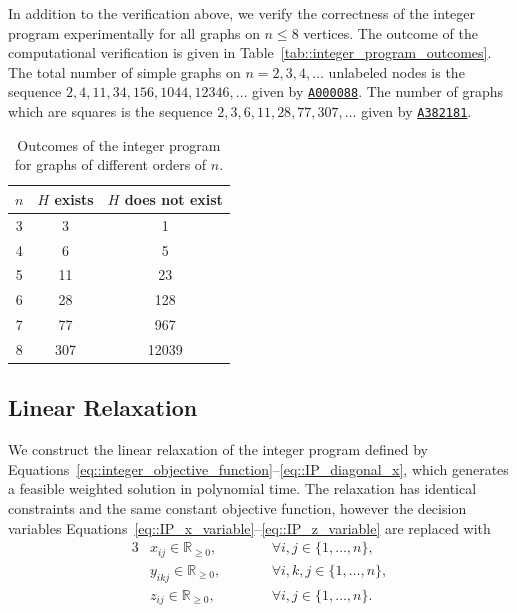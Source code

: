 \documentclass[11pt]{article}
\begin{document}
In addition to the verification above, we verify the correctness of the integer program experimentally for all graphs on $n \leq 8$ vertices. The outcome of the computational verification is given in
Table~\eqref{tab::integer_program_outcomes}. The total number of simple graphs on $n=2,3,4,\dots$ unlabeled nodes is the sequence $2,4,11,34,156,1044,12346,\dots$ given by \href{https://oeis.org/A000088}{\texttt{A000088}}. The number of graphs which are squares is the sequence
$2,3,6,11,28,77,307,\dots$ given by \href{https://oeis.org/A382181}{\texttt{A382181}}.

\begin{table}[!htbp]
  \centering
  \begin{tabular}{c|cc}
  \hline
  $n$ 
  & $H$ exists
  & $H$ does not exist \\
  \hline
  3 & 3   & 1    \\
  4 & 6   & 5    \\
  5 & 11  & 23   \\
  6 & 28  & 128  \\
  7 & 77  & 967  \\
  8 & 307 & 12039 \\
  \hline
  \end{tabular}
  \caption{Outcomes of the integer program for graphs of different orders of $n$.}
  \label{tab::integer_program_outcomes}
\end{table}


\subsection{Linear Relaxation} \label{subsec::LP}

We construct the linear relaxation of the integer program defined by Equations~\eqref{eq::integer_objective_function}--\eqref{eq::IP_diagonal_x}, which generates a feasible weighted solution in polynomial time. The relaxation has identical constraints and the same constant objective function, however the decision variables Equations~\eqref{eq::IP_x_variable}--\eqref{eq::IP_z_variable} are replaced with
\begin{alignat}{3}
& x_{ij} \in  \mathbb{R}_{\geq 0}, 
&&\qquad \forall i,j \in \{1, \dots, n\}, \label{eq::LP_x_variable} \\
& y_{ikj} \in \mathbb{R}_{\geq 0}, 
&&\qquad \forall i,k,j \in \{1, \dots, n\}, \label{eq::LP_y_variable} \\
& z_{ij} \in \mathbb{R}_{\geq 0}, 
&&\qquad \forall i,j \in \{1, \dots, n\} \label{eq::LP_z_variable}. 
\end{alignat} 
\end{document}
